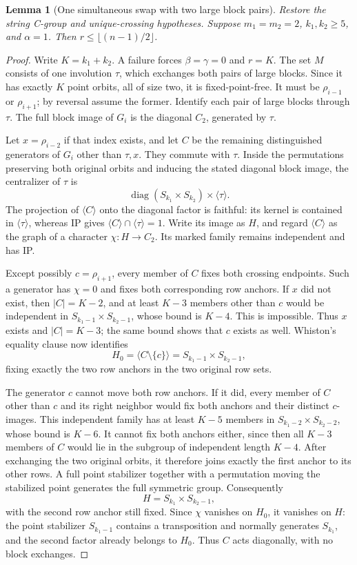 \documentclass[11pt,a4paper]{article}
\newtheorem{lemma}{Lemma}
\newcommand{\gen}[1]{\langle#1\rangle}
\begin{document}
\begin{lemma}[One simultaneous swap with two large block pairs]\label{single-swap}
Restore the string C-group and unique-crossing hypotheses.
Suppose $m_1=m_2=2$, $k_1,k_2\geq5$, and $\alpha=1$.
Then $r\leq\lfloor(n-1)/2\rfloor$.
\end{lemma}
\begin{proof}
Write $K=k_1+k_2$. A failure forces $\beta=\gamma=0$ and
$r=K$. The set $M$ consists of one involution $\tau$, which
exchanges both pairs of large blocks. Since it has exactly
$K$ point orbits, all of size two, it is fixed-point-free.
It must be $\rho_{i-1}$ or $\rho_{i+1}$; by reversal assume
the former. Identify each pair of large blocks through $\tau$.
The full block image of $G_i$ is the diagonal $C_2$, generated
by $\tau$.

Let $x=\rho_{i-2}$ if that index exists, and let $C$ be the
remaining distinguished generators of $G_i$ other than $\tau,x$.
They commute with $\tau$. Inside the permutations preserving
both original orbits and inducing the stated diagonal block
image, the centralizer of $\tau$ is
\[
 \operatorname{diag}(S_{k_1}\times S_{k_2})\times\gen\tau.
\]
The projection of $\gen C$ onto the diagonal factor is faithful:
its kernel is contained in $\gen\tau$, whereas IP gives
$\gen C\cap\gen\tau=1$. Write its image as $H$, and regard
$\gen C$ as the graph of a character $\chi:H\to C_2$.
Its marked family remains independent and has IP.

Except possibly $c=\rho_{i+1}$, every member of $C$ fixes both
crossing endpoints. Such a generator has $\chi=0$ and fixes
both corresponding row anchors. If $x$ did not exist, then
$|C|=K-2$, and at least $K-3$ members other than $c$ would be
independent in $S_{k_1-1}\times S_{k_2-1}$, whose bound is
$K-4$. This is impossible. Thus $x$ exists and $|C|=K-3$;
the same bound shows that $c$ exists as well. Whiston's equality
clause now identifies
\[
 H_0=\gen{C\setminus\{c\}}
       =S_{k_1-1}\times S_{k_2-1},
\]
fixing exactly the two row anchors in the two original row sets.

The generator $c$ cannot move both row anchors. If it did, every
member of $C$ other than $c$ and its right neighbor would fix
both anchors and their distinct $c$-images. This independent
family has at least $K-5$ members in
$S_{k_1-2}\times S_{k_2-2}$, whose bound is $K-6$.
It cannot fix both anchors either, since then all $K-3$ members
of $C$ would lie in the subgroup of independent length $K-4$.
After exchanging the two original orbits, it therefore joins
exactly the first anchor to its other rows. A full point
stabilizer together with a permutation moving the stabilized
point generates the full symmetric group. Consequently
\[
 H=S_{k_1}\times S_{k_2-1},
\]
with the second row anchor still fixed. Since $\chi$ vanishes
on $H_0$, it vanishes on $H$: the point stabilizer
$S_{k_1-1}$ contains a transposition and normally generates
$S_{k_1}$, and the second factor already belongs to $H_0$.
Thus $C$ acts diagonally, with no block exchanges.


\end{proof}
\end{document}
